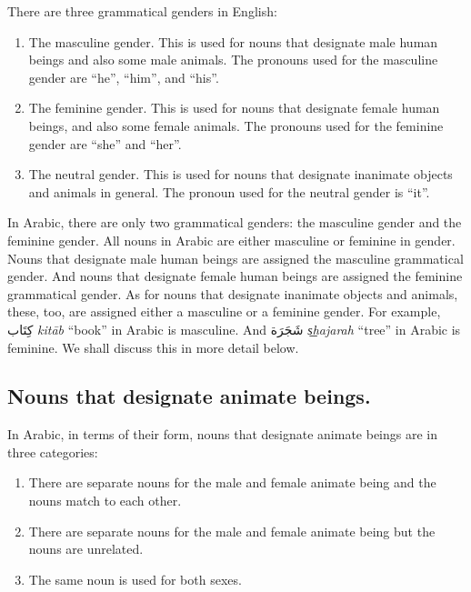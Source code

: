 \documentclass[
  10pt,
]{book}
\providecommand{\tightlist}{%
  \setlength{\itemsep}{0pt}\setlength{\parskip}{0pt}}
\begin{document}
There are three grammatical genders in English:

\begin{enumerate}
\def\labelenumi{\arabic{enumi}.}
\tightlist
\item
  The masculine gender. This is used for nouns that designate male human beings and also some male animals. The pronouns used for the masculine gender are \enquote{he}, \enquote{him}, and \enquote{his}.
\item
  The feminine gender. This is used for nouns that designate female human beings, and also some female animals. The pronouns used for the feminine gender are \enquote{she} and \enquote{her}.
\item
  The neutral gender. This is used for nouns that designate inanimate objects and animals in general. The pronoun used for the neutral gender is \enquote{it}.
\end{enumerate}

In Arabic, there are only two grammatical genders: the masculine gender and the feminine gender.
All nouns in Arabic are either masculine or feminine in gender.
Nouns that designate male human beings are assigned the masculine grammatical gender. And
nouns that designate female human beings are assigned the feminine grammatical gender.
As for nouns that designate inanimate objects and animals, these, too, are assigned either a masculine or a feminine gender. For example, \foreignlanguage{arabic}{کِتَاب} \emph{kitāb} \enquote{book} in Arabic is masculine. And \foreignlanguage{arabic}{شَجَرَة} \emph{s͟hajarah} \enquote{tree} in Arabic is feminine.
We shall discuss this in more detail below.

\subsection{Nouns that designate animate beings.}\label{nouns-that-designate-animate-beings.}

In Arabic, in terms of their form, nouns that designate animate beings are in three categories:

\begin{enumerate}
\def\labelenumi{\arabic{enumi}.}
\tightlist
\item
  There are separate nouns for the male and female animate being and the nouns match to each other.
\item
  There are separate nouns for the male and female animate being but the nouns are unrelated.
\item
  The same noun is used for both sexes.
\end{enumerate}
\end{document}
